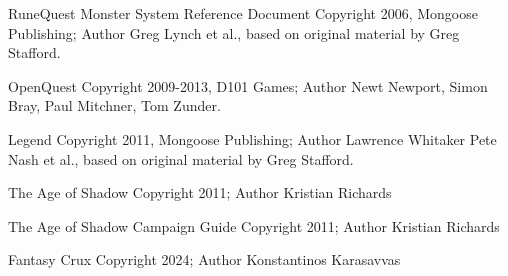 \begin{scriptsize}
\noindent RuneQuest Monster System Reference Document Copyright 2006, Mongoose Publishing; Author Greg Lynch et al., based on original material by Greg Stafford.

\noindent OpenQuest Copyright 2009-2013, D101 Games; Author Newt Newport, Simon Bray, Paul Mitchner, Tom Zunder.

\noindent Legend Copyright 2011, Mongoose Publishing; Author Lawrence Whitaker Pete Nash et al., based on original material by Greg Stafford.

\noindent The Age of Shadow Copyright 2011; Author Kristian Richards

\noindent The Age of Shadow Campaign Guide Copyright 2011; Author Kristian Richards

\noindent Fantasy Crux Copyright 2024; Author Konstantinos Karasavvas
\end{scriptsize}
